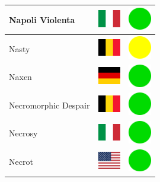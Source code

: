 \documentclass[12pt, a4paper, twoside]{report}
\begin{document}
\begin{center}
\begin{longtable}{|p{5cm}|p{2cm}|p{2cm}|}
 Napoli Violenta                                            & \includegraphics[width=1cm]{../4x3/it} &   \includegraphics[width=1cm]{../likes/y} \\ \hline
 Nasty                                                      & \includegraphics[width=1cm]{../4x3/be} &   \includegraphics[width=1cm]{../likes/m} \\ \hline
 Naxen                                                      & \includegraphics[width=1cm]{../4x3/de} &   \includegraphics[width=1cm]{../likes/y} \\ \hline
 Necromorphic Despair                                       & \includegraphics[width=1cm]{../4x3/be} &   \includegraphics[width=1cm]{../likes/y} \\ \hline
 Necrosy                                                    & \includegraphics[width=1cm]{../4x3/it} &   \includegraphics[width=1cm]{../likes/y} \\ \hline
 Necrot                                                     & \includegraphics[width=1cm]{../4x3/us} &   \includegraphics[width=1cm]{../likes/y} \\ \hline

\end{longtable}
\end{center}
\end{document}
